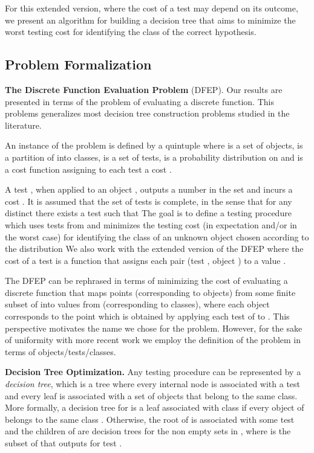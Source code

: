 \documentclass{llncs}
\begin{document}
For this extended version, where the cost of a test may depend on its outcome, 
we present an algorithm for building a decision tree that aims to  minimize the worst testing cost for 
identifying the class of the correct hypothesis.




 
\subsection{Problem Formalization} 
\noindent
{\bf The Discrete Function Evaluation Problem} (DFEP). Our results are presented in terms of the problem of evaluating 
a discrete function. This problems generalizes most decision tree construction problems studied in the literature. 




An instance of the problem is defined by  a quintuple   
where  is a set of objects, 
 is a partition of  into  classes,  is a set of tests,  is a probability distribution on 
 and  is a cost function assigning to each test  a cost . 


A test ,  when applied to an object  , outputs a number  in the set   and incurs a cost .
It is assumed that the set of tests is complete, in the sense that for any distinct  there exists a test
 such that  
The goal is to define a testing procedure which uses tests from  and minimizes the testing cost 
(in expectation and/or in the worst case)
for identifying the class of an unknown object  chosen according to the distribution  
We also work with the extended version of the DFEP where the cost of a test
is a function that assigns each pair (test , object ) to a value .



The DFEP can be rephrased in terms of minimizing the cost of evaluating a discrete function that 
maps points (corresponding to objects) from some finite subset of  into
values from  (corresponding to classes), where  each object  corresponds to the point  
 which is obtained by applying each test of   to .  
This perspective motivates the name we chose for the problem. However, for the sake of uniformity with more recent work \cite{golovin,bellala} we employ the definition of the problem in terms of objects/tests/classes.


\medskip



\noindent
{\bf Decision Tree Optimization.} Any testing procedure can be represented by a \emph{decision tree}, which is a tree
where every internal node is associated with a test and every leaf is associated with a set
of objects that belong to the same class.
More formally, a decision tree  for   is a leaf
associated with class  
if every object of  belongs to the same class . Otherwise, the root   of  is associated with some test  and  
the children of  are  decision trees for the non empty sets in ,
where  is the subset of  that outputs  for test .
 
\end{document}
